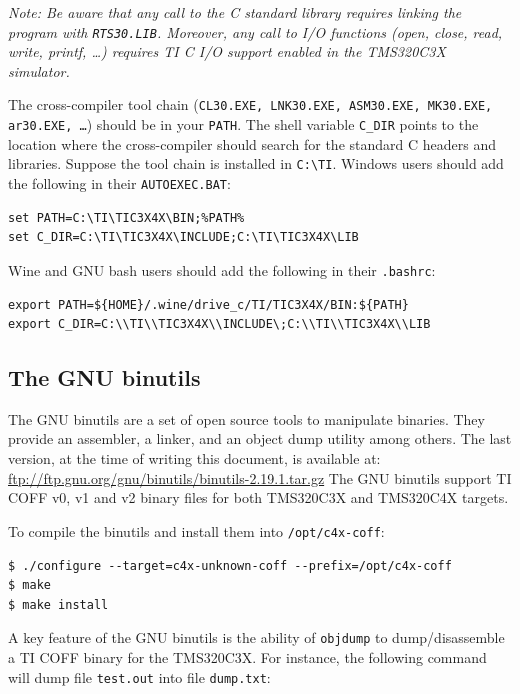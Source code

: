 \textit{Note: Be aware that any call to the C standard library requires linking the program with \texttt{RTS30.LIB}.
Moreover, any call to I/O functions (open, close, read, write, printf, \ldots) requires TI C I/O support enabled in the TMS320C3X simulator.}

The cross-compiler tool chain (\texttt{CL30.EXE, LNK30.EXE, ASM30.EXE, MK30.EXE, ar30.EXE, \ldots}) should be in your \texttt{PATH}.
The shell variable \texttt{C\_DIR} points to the location where the cross-compiler should search for the standard C headers and libraries.
Suppose the tool chain is installed in \texttt{C:{\textbackslash}TI}.
Windows users should add the following in their \texttt{AUTOEXEC.BAT}:
\begin{verbatim}
set PATH=C:\TI\TIC3X4X\BIN;%PATH%
set C_DIR=C:\TI\TIC3X4X\INCLUDE;C:\TI\TIC3X4X\LIB
\end{verbatim}
Wine and GNU bash users should add the following in their \texttt{.bashrc}:
\begin{verbatim}
export PATH=${HOME}/.wine/drive_c/TI/TIC3X4X/BIN:${PATH}
export C_DIR=C:\\TI\\TIC3X4X\\INCLUDE\;C:\\TI\\TIC3X4X\\LIB
\end{verbatim}

\subsection{The GNU binutils}

The GNU binutils are a set of open source tools to manipulate binaries. They provide an assembler, a linker, and an object dump utility among others.
The last version, at the time of writing this document, is available at: \url{ftp://ftp.gnu.org/gnu/binutils/binutils-2.19.1.tar.gz}
The GNU binutils support TI COFF v0, v1 and v2 binary files for both TMS320C3X and TMS320C4X targets.

To compile the binutils and install them into \texttt{/opt/c4x-coff}:

\begin{verbatim}
$ ./configure --target=c4x-unknown-coff --prefix=/opt/c4x-coff
$ make
$ make install
\end{verbatim}

A key feature of the GNU binutils is the ability of \texttt{objdump} to dump/disassemble a TI COFF binary for the TMS320C3X.
For instance, the following command will dump file \texttt{test.out} into file \texttt{dump.txt}:

